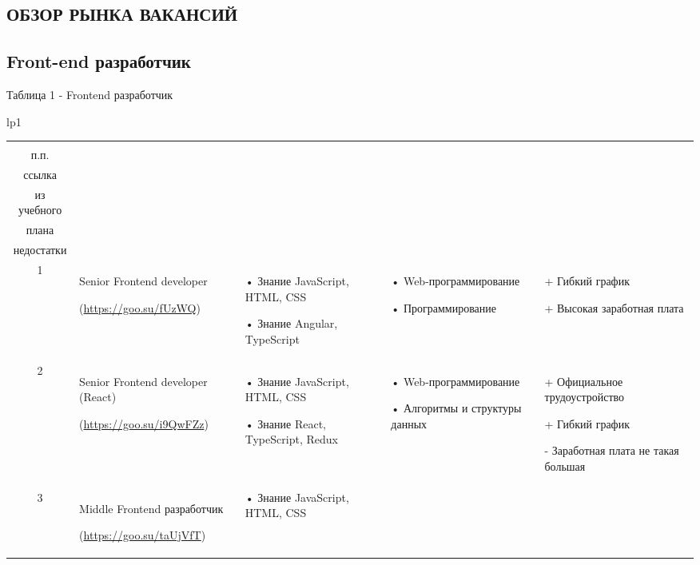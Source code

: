 \documentclass[14pt]{extreport}
\begin{document}
\begin{landscape}
\chapter{ОБЗОР РЫНКА ВАКАНСИЙ\label{chapter2}}

\section{Front-end разработчик}

Таблица 1 - Frontend разработчик
\begin{longtable}[H]{lp{1\linewidth}}
\caption{Frontend разработчик \label{table1}}


\centering

\begin{small}


    \begin{tabular}{|c|p{}|p{6cm}|p{5cm}|p{5cm}|}
	\hline 
	\makecell{№ \\ п.п.} &	\makecell{Название должности,\\ ссылка} &	\makecell{Требования} & 	\makecell{Дисциплины \\ из учебного \\плана} &	\makecell{Преимущества и \\недостатки}  \\ 
	\hline 
	1	& Senior Frontend developer

(\url{https://goo.su/fUzWQ})
& •	Знание JavaScript, HTML, CSS

•	Знание Angular, TypeScript

 &	•	Web-программирование
 
•	Программирование
 & + Гибкий график

+ Высокая заработная плата

 \\
	\hline
	2 & Senior Frontend developer (React)
	
(\url{https://goo.su/i9QwFZz})
& •	Знание JavaScript, HTML, CSS

•	Знание React, TypeScript, Redux
&	•	Web-программирование
 
•	Алгоритмы и структуры данных
&+	Официальное трудоустройство 

+ Гибкий график

- Заработная плата не такая большая\\


	\hline
	3 & Middle Frontend разработчик
	
(\url{https://goo.su/taUjVfT}) 
& •	Знание JavaScript, HTML, CSS


\end{tabular}
\end{small}
\end{longtable}
\end{landscape}
\end{document}
